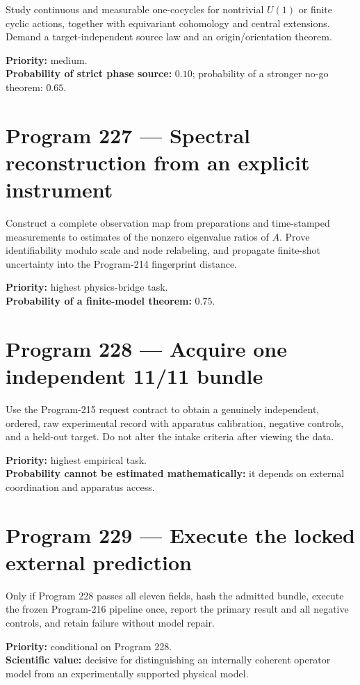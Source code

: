 \documentclass[11pt,a4paper,openany]{report}
\begin{document}
Study continuous and measurable one-cocycles for nontrivial \(U(1)\) or finite cyclic actions, together with equivariant cohomology and central extensions. Demand a target-independent source law and an origin/\allowbreak{}orientation theorem.

\textbf{Priority:} medium.\\
\textbf{Probability of strict phase source:} \(0.10\); probability of a stronger no-go theorem: \(0.65\).

\section{Program 227 --- Spectral reconstruction from an explicit instrument}

Construct a complete observation map from preparations and time-stamped measurements to estimates of the nonzero eigenvalue ratios of \(A\). Prove identifiability modulo scale and node relabeling, and propagate finite-shot uncertainty into the Program-214 fingerprint distance.

\textbf{Priority:} highest physics-bridge task.\\
\textbf{Probability of a finite-model theorem:} \(0.75\).

\section{Program 228 --- Acquire one independent 11/\allowbreak{}11 bundle}

Use the Program-215 request contract to obtain a genuinely independent, ordered, raw experimental record with apparatus calibration, negative controls, and a held-out target. Do not alter the intake criteria after viewing the data.

\textbf{Priority:} highest empirical task.\\
\textbf{Probability cannot be estimated mathematically:} it depends on external coordination and apparatus access.

\section{Program 229 --- Execute the locked external prediction}

Only if Program 228 passes all eleven fields, hash the admitted bundle, execute the frozen Program-216 pipeline once, report the primary result and all negative controls, and retain failure without model repair.

\textbf{Priority:} conditional on Program 228.\\
\textbf{Scientific value:} decisive for distinguishing an internally coherent operator model from an experimentally supported physical model.
\end{document}

